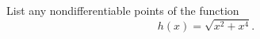 List any nondifferentiable points of the function
\begin{equation*}
  h(x)=\sqrt{x^2+x^4}.
\end{equation*}
